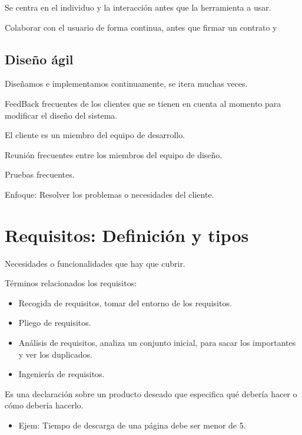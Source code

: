 \documentclass[12pt, twoside, openright]{report} %
\begin{document}
    Se centra en el individuo y la interacción antes que la herramienta
    a usar.

    Colaborar con el usuario de forma continua, antes que firmar un
    contrato y

    
\subsection{Diseño ágil}


    Diseñamos e implementamos continuamente, se itera muchas veces.

    FeedBack frecuentes de los clientes que se tienen en cuenta al
    momento para modificar el diseño del sistema.

    El cliente es un miembro del equipo de desarrollo.

    Reunión frecuentes entre los miembros del equipo de diseño.

    Pruebas frecuentes.

    Enfoque: Resolver los problemas o necesidades del cliente.

    
\section{Requisitos: Definición y tipos}

    Necesidades o funcionalidades que hay que cubrir.

    Términos relacionados los requisitos:

    \begin{itemize}
    
    \item
      Recogida de requisitos, tomar del entorno de los requisitos.
    \item
      Pliego de requisitos.
    \item
      Análisis de requisitos, analiza un conjunto inicial, para sacar
      los importantes y ver los duplicados.
    \item
      Ingeniería de requisitos.
    \end{itemize}

    Es una declaración sobre un producto deseado que especifica qué
    debería hacer o cómo debería hacerlo.

    \begin{itemize}
    
    \item
      Ejem: Tiempo de descarga de una página debe ser menor de 5.
    \end{itemize}
\end{document}

